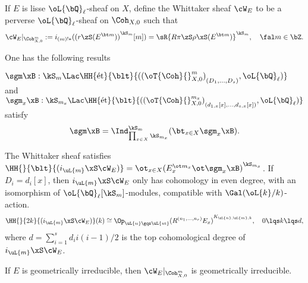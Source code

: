 \documentclass[article, a4paper, twoside]{universal}
\begin{document}
\begin{thm}
	If $E$ is lisse $\oL{\bQ}_{\ell}$-sheaf on $X$, define the Whittaker sheaf $\cW_{E}$ to be a perverse $\oL{\bQ}_{\ell}$-sheaf on $\Coh_{X,0}$ such that
	\[
		\cW_{E}|_{\Coh_{X,0}^{m}}:=i_{(m)!*}({(r\zS(E^{\bt m}))}^{\kS_{m}}[m])=\sR{R\pi\zS\rho\xS(E^{\bt m})}^{\kS_{m}},\quad \fal m\in\bZ.
	\]

	One has the following results
	\begin{enr}[label=(\arabic*)]
		\item $\sgm\xB:\kS_{m}\Lac\HH{\text{{\'e}t}}{\blt}{({(\oT{\Coh}{}_{X,0}^{m})}_{(D_{1},\ldots,D_{s})},\oL{\bQ}_{\ell})}$ and $\sgm_{x}\xB:\kS_{m_{x}}\Lac\HH{\text{{\'e}t}}{\blt}{({(\oT{\Coh}{}_{X,0}^{m_{x}})}_{(d_{1,x}[x],\ldots,d_{s,x}[x])},\oL{\bQ}_{\ell})}$ satisfy
		\[
			\sgm\xB=\Ind_{\prod_{x\in X}\kS_{m_{x}}}^{\kS_{m}}(\bt_{x\in X}\sgm_{x}\xB).
		\]
		\item The Whittaker sheaf satisfies $\HH{}{\blt}{(i_{\uL{m}}\xS\cW_{E})}=\ot_{x\in X}{(E_{x}^{\ot m_{x}}\ot\sgm_{x}\xB)}^{\kS_{m_{x}}}$. If $D_{i}=d_{i}[x]$, then $i_{\uL{m}}\xS\cW_{E}$ only has cohomology in even degree, with an isomorphism of $\oL{\bQ}_{\ell}[\kS_{m}]$-modules, compatible with $\Gal(\oL{k}/k)$-action.
		\[
			\HH{}{2k}{(i_{\uL{m}}\xS\cW_{E})}(k)\cong\Op_{\uL{n}\gqs\uL{m}}{(R^{(n_{1},\ldots,n_{r})}E_{x})}^{K_{\uL{n},\uL{m},k}},\quad 0\lqs k\lqs d,
		\]
		where $d=\sum_{i=1}^{s}d_{i}i(i-1)/2$ is the top cohomological degree of $i_{\uL{m}}\xS\cW_{E}$.
		\item If $E$ is geometrically irreducible, then $\cW_{E}|_{\Coh_{X,0}^{m}}$ is geometrically irreducible.
	\end{enr}
\end{thm}

\end{document}
